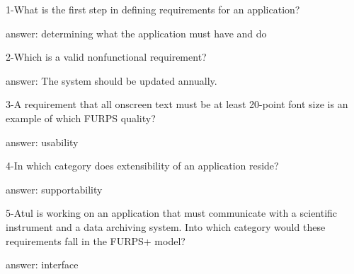 1-What is the first step in defining requirements for an application?


answer: determining what the application must have and do

2-Which is a valid nonfunctional requirement?


answer: The system should be updated annually.

3-A requirement that all onscreen text must be at least 20-point font size is an example of which FURPS quality?


answer: usability

4-In which category does extensibility of an application reside?


answer: supportability

5-Atul is working on an application that must communicate with a scientific instrument and a data archiving system. Into which category would these requirements fall in the FURPS+ model?


answer: interface
